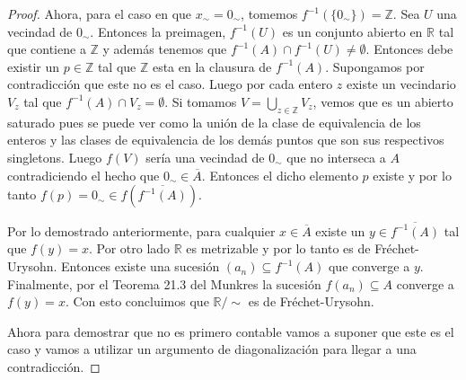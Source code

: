 \documentclass[letter,twoside,12pt]{article}
\begin{document}
\begin{enumerate}
\begin{proof}
Ahora, para el caso en que $x_\sim = 0_\sim$, tomemos $f^{-1}(\{0_\sim\})= \mathbb{Z}$.  Sea $ U $ una vecindad de $ 0_\sim $. Entonces la preimagen, $f^{-1}(U)$ es un conjunto abierto en $\mathbb{R}$ tal que contiene a $\mathbb{Z}$ y además tenemos que $ f^{-1}(A)\cap f^{-1}(U) \not = \emptyset $. Entonces debe existir un $ p \in \mathbb{Z} $ tal que $\mathbb{Z}$ esta en la clausura de $ f^{-1}(A) $. Supongamos por contradicción que este no es el caso. Luego por cada entero $z$ existe un vecindario $V_z  $ tal que $f^{-1}(A) \cap V_z  = \emptyset$. Si tomamos $V = \bigcup_{z \in \mathbb{Z}} V_z$, vemos que es un abierto saturado pues se puede ver como la unión de la clase de equivalencia de los enteros y las clases de equivalencia de los demás puntos que son sus respectivos singletons. Luego $f(V)$ sería una vecindad de $0_\sim$ que no interseca a $A$ contradiciendo el hecho que $ 0_\sim \in \overline{A}$. Entonces el dicho elemento $p$ existe y por lo tanto $f(p)=0_\sim \in f(\overline{f^{-1}(A)})$.

Por lo demostrado anteriormente, para cualquier $x \in \overline{A} $ existe un $y \in \overline{f^{-1}(A)}$ tal que $f(y)=x$. Por otro lado $\mathbb{R}$ es metrizable y por lo tanto es de Fréchet-Urysohn. Entonces existe una sucesión $ (a_n) \subseteq f^{-1}(A)$ que converge a $y$. Finalmente, por el Teorema 21.3 del Munkres la sucesión $f(a_n)  \subseteq A $ converge a $f(y)=x$. Con esto concluimos que $\mathbb{R}/\sim$ es de Fréchet-Urysohn.

Ahora para demostrar que no es primero contable vamos a suponer que este es el caso y vamos a utilizar un argumento de diagonalización para llegar a una contradicción.


\end{proof}
\end{enumerate}
\end{document}

